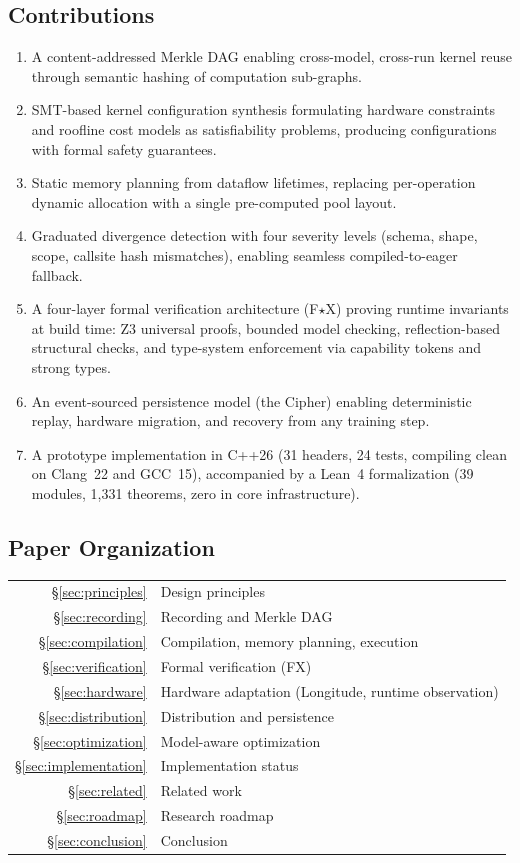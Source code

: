 \subsection{Contributions}

\begin{enumerate}
  \item A content-addressed Merkle DAG enabling cross-model, cross-run kernel reuse through semantic hashing of computation sub-graphs.
  \item SMT-based kernel configuration synthesis formulating hardware constraints and roofline cost models as satisfiability problems, producing configurations with formal safety guarantees.
  \item Static memory planning from dataflow lifetimes, replacing per-operation dynamic allocation with a single pre-computed pool layout.
  \item Graduated divergence detection with four severity levels (schema, shape, scope, callsite hash mismatches), enabling seamless compiled-to-eager fallback.
  \item A four-layer formal verification architecture (F$\star$X) proving runtime invariants at build time: Z3 universal proofs,  bounded model checking, reflection-based structural checks, and type-system enforcement via capability tokens and strong types.
  \item An event-sourced persistence model (the Cipher) enabling deterministic replay, hardware migration, and recovery from any training step.
  \item A prototype implementation in C++26 (31 headers, 24 tests, compiling clean on Clang~22 and GCC~15), accompanied by a Lean~4 formalization (39 modules, 1,331 theorems, zero  in core infrastructure).
\end{enumerate}

\subsection{Paper Organization}

\begin{tabular}{@{}rl@{}}
\S\ref{sec:principles} & Design principles \\
\S\ref{sec:recording} & Recording and Merkle DAG \\
\S\ref{sec:compilation} & Compilation, memory planning, execution \\
\S\ref{sec:verification} & Formal verification (FX) \\
\S\ref{sec:hardware} & Hardware adaptation (Longitude, runtime observation) \\
\S\ref{sec:distribution} & Distribution and persistence \\
\S\ref{sec:optimization} & Model-aware optimization \\
\S\ref{sec:implementation} & Implementation status \\
\S\ref{sec:related} & Related work \\
\S\ref{sec:roadmap} & Research roadmap \\
\S\ref{sec:conclusion} & Conclusion \\
\end{tabular}
